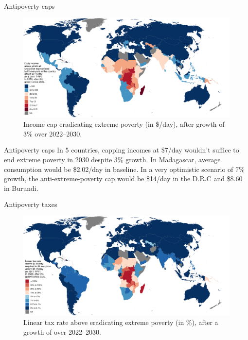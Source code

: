 \documentclass[aspectratio=169,xcolor=dvipsnames, 11pt,mathserif]{beamer}
\begin{document}
\begin{frame}{Antipoverty caps}
    \begin{figure}
        \caption{Income cap eradicating extreme poverty (in \$/day), after growth of 3\% over 2022--2030. 
        }
        \includegraphics[height=.85\textheight]{../figures/y_expropriated_2_average.pdf}
      \end{figure} 
\end{frame}

\begin{frame}{Antipoverty caps}    %
    \bbsp 
    \ip In 5 countries, capping incomes at \$7/day wouldn't suffice to end extreme poverty in 2030 despite 3\% growth.
    \ip In Madagascar, average consumption would be \$2.02/day in baseline.
    \ip In a very optimistic scenario of 7\% growth, the anti-extreme-poverty cap would be \$14/day in the D.R.C and \$8.60 in Burundi.
    \ee 
\end{frame}

\begin{frame}{Antipoverty taxes}    
    \bbsp 
    \ip 
    \ee 
    \begin{figure}
      \caption{Linear tax rate above  eradicating extreme poverty (in \%), after a growth of  over 2022--2030. 
      }
      \includegraphics[height=.85\textheight]{../figures/antipoverty_2_tax_7_average.pdf}
    \end{figure}
\end{frame}
\end{document}
